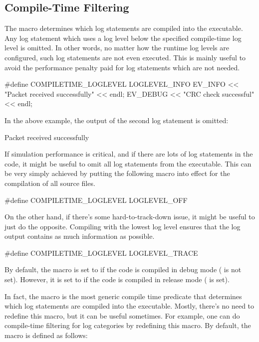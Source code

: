 \subsection{Compile-Time Filtering}
\label{sec:config-sim:compile-time-log-filtering}

The  macro determines which log statements
are compiled into the executable. Any log statement which uses a log level below
the specified compile-time log level is omitted. In other words, no matter how
the runtime log levels are configured, such log statements are not even executed.
This is mainly useful to avoid the performance penalty paid for log statements
which are not needed.

\begin{cpp}
#define COMPILETIME_LOGLEVEL LOGLEVEL_INFO
EV_INFO << "Packet received successfully" << endl;
EV_DEBUG << "CRC check successful" << endl;
\end{cpp}

In the above example, the output of the second log statement is omitted:

\begin{filelisting}
[INFO] Packet received successfully
\end{filelisting}

If simulation performance is critical, and if there are lots of log statements
in the code, it might be useful to omit all log statements from the executable.
This can be very simply achieved by putting the following macro into effect for
the compilation of all source files.

\begin{cpp}
#define COMPILETIME_LOGLEVEL LOGLEVEL_OFF
\end{cpp}

On the other hand, if there's some hard-to-track-down issue, it might be useful
to just do the opposite. Compiling with the lowest log level ensures that the
log output contains as much information as possible.

\begin{cpp}
#define COMPILETIME_LOGLEVEL LOGLEVEL_TRACE
\end{cpp}

By default, the  macro is set to
 if the code is compiled in debug mode ( is
not set). However, it is set to  if the code is compiled
in release mode ( is set).

In fact, the  macro is the most generic compile
time predicate that determines which log statements are compiled into the executable.
Mostly, there's no need to redefine this macro, but it can be useful sometimes.
For example, one can do compile-time filtering for log categories by redefining
this macro. By default, the  macro is defined
as follows:

